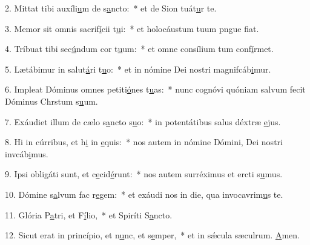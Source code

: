 2. Mittat tibi auxíli\uline{u}m de s\uline{a}ncto:~* et de Sion tuát\uline{u}r te.\par 
3. Memor sit omnis sacrif\uline{í}cii t\uline{u}i:~* et holocáustum tuum pngue f\uline{i}at.\par 
4. Tríbuat tibi sec\uline{ú}ndum cor t\uline{u}um:~* et omne consílium tum conf\uline{í}rmet.\par 
5. Lætábimur in salut\uline{á}ri t\uline{u}o:~* et in nómine Dei nostri magnifcáb\uline{i}mur.\par 
6. Impleat Dóminus omnes petiti\uline{ó}nes t\uline{u}as:~* nunc cognóvi quóniam salvum fecit Dóminus Chrstum s\uline{u}um.\par 
7. Exáudiet illum de cælo s\uline{a}ncto s\uline{u}o:~* in potentátibus salus déxtræ \uline{e}jus.\par 
8. Hi in cúrribus, et h\uline{i} in \uline{e}quis:~* nos autem in nómine Dómini, Dei nostri invcáb\uline{i}mus.\par 
9. Ipsi obligáti sunt, et c\uline{e}cid\uline{é}runt:~* nos autem surréximus et ercti s\uline{u}mus.\par 
10. Dómine s\uline{a}lvum fac r\uline{e}gem:~* et exáudi nos in die, qua invocavrim\uline{u}s te.\par 
11. Glória P\uline{a}tri, et F\uline{í}lio,~* et Spiríti S\uline{a}ncto.\par 
12. Sicut erat in princípio, et n\uline{u}nc, et s\uline{e}mper,~* et in sǽcula sæculrum. \uline{A}men.\par 
